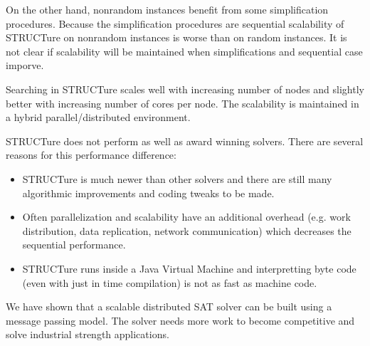 On the other hand, nonrandom instances benefit from some
simplification procedures. Because the simplification procedures
are sequential scalability of STRUCTure on nonrandom instances is
worse than on random instances. It is not clear if scalability will
be maintained when simplifications and sequential case imporve.

Searching in STRUCTure scales well with increasing number of nodes
and slightly better with increasing number of cores per node.
The scalability is maintained in a hybrid parallel/distributed
environment.

STRUCTure does not perform as well as award winning solvers.
There are several reasons for this performance difference:
\begin{itemize}
  \item STRUCTure is much newer than other solvers and there are
  still many algorithmic improvements and coding tweaks to be made.
  \item Often parallelization and scalability have an additional
  overhead (e.g. work distribution, data replication, network
  communication) which decreases the sequential performance.
  \item STRUCTure runs inside a Java Virtual Machine and
  interpretting byte code (even with just in time compilation)
  is not as fast as machine code.
\end{itemize}


We have shown that a scalable distributed SAT solver can be built
using a message passing model. The solver needs more work to become
competitive and solve industrial strength applications.
